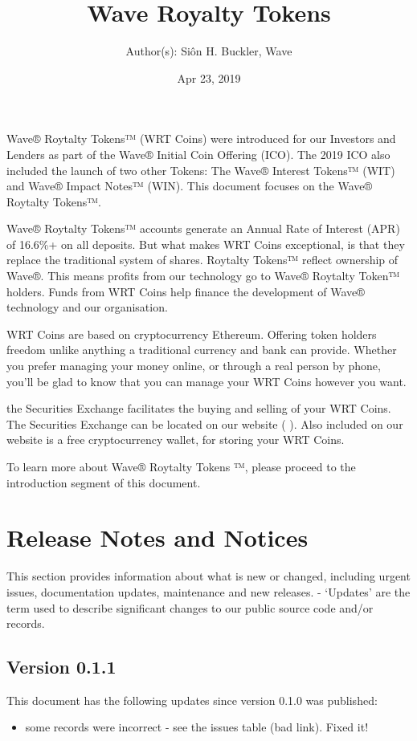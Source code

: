 \documentclass[letterpaper,10pt,openany,oneside,english]{sphinxmanual}
\title{Wave Royalty Tokens}
\date{Apr 23, 2019}
\author{Author(s): Siôn H. Buckler, Wave}
\begin{document}
\maketitle
\sphinxtableofcontents
{}\label{\detokenize{index::doc}}


Wave® Roytalty Tokens™ (WRT Coins) were introduced for our Investors and Lenders as part of the Wave® Initial Coin Offering (ICO).
The 2019 ICO also included the launch of two other Tokens: The Wave® Interest Tokens™ (WIT) and Wave® Impact Notes™ (WIN).
This document focuses on the Wave® Roytalty Tokens™.

Wave® Roytalty Tokens™ accounts generate an Annual Rate of Interest (APR) of 16.6\%+ on all deposits.
But what makes WRT Coins exceptional, is that they replace the traditional system of shares.
Roytalty Tokens™ reflect ownership of Wave®. This means profits from our technology go to Wave® Roytalty Token™ holders.
Funds from WRT Coins help finance the development of Wave® technology and our organisation.

WRT Coins are based on cryptocurrency Ethereum. Offering token holders freedom unlike anything a traditional currency and bank can provide.
Whether you prefer managing your money online, or through a real person by phone, you’ll be glad to know that you can manage your WRT Coins however you want.

the Securities Exchange facilitates the buying and selling of your WRT Coins.
The Securities Exchange can be located on our website (  ).
Also included on our website is a free cryptocurrency wallet, for storing your WRT Coins.

To learn more about Wave® Roytalty Tokens ™, please proceed to the introduction segment of this document.


\chapter{Release Notes and Notices}
\label{\detokenize{releasenotes:release-notes-and-notices}}\label{\detokenize{releasenotes::doc}}
This section provides information about what is new or changed, including urgent issues, documentation updates, maintenance and new releases.
- ‘Updates’ are the term used to describe significant changes to our public source code and/or records.


\section{Version 0.1.1}
\label{\detokenize{releasenotes:version-0-1-1}}
This document has the following updates since version 0.1.0 was published:
\begin{itemize}
\item {} 
some records were incorrect - see the issues table (bad link). Fixed it!

\end{itemize}
\end{document}
